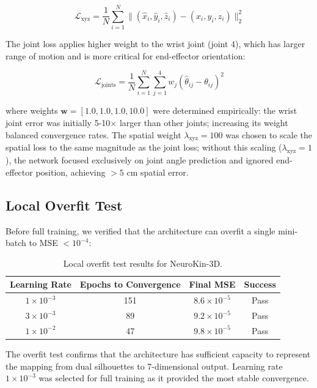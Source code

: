 \documentclass[12pt,a4paper,oneside]{report}
\begin{document}
\begin{equation}
\mathcal{L}_{\text{xyz}} = \frac{1}{N} \sum_{i=1}^{N} \|(\hat{x}_i, \hat{y}_i, \hat{z}_i) - (x_i, y_i, z_i)\|_2^2
\end{equation}

The joint loss applies higher weight to the wrist joint (joint 4), which has larger range of motion and is more critical for end-effector orientation:

\begin{equation}
\mathcal{L}_{\text{joints}} = \frac{1}{N} \sum_{i=1}^{N} \sum_{j=1}^{4} w_j (\hat{\theta}_{ij} - \theta_{ij})^2
\end{equation}

where weights $\mathbf{w} = [1.0, 1.0, 1.0, 10.0]$ were determined empirically: the wrist joint error was initially 5-10$\times$ larger than other joints; increasing its weight balanced convergence rates. The spatial weight $\lambda_{\text{xyz}} = 100$ was chosen to scale the spatial loss to the same magnitude as the joint loss; without this scaling ($\lambda_{\text{xyz}} = 1$), the network focused exclusively on joint angle prediction and ignored end-effector position, achieving $>5$ cm spatial error.

\subsection{Local Overfit Test}
\label{subsec:local_overfit_test}

Before full training, we verified that the architecture can overfit a single mini-batch to MSE $< 10^{-4}$:

\begin{table}[H]
\centering
\caption{Local overfit test results for NeuroKin-3D.}
\label{tab:overfit_test}
\begin{tabular}{cccc}
\toprule
Learning Rate & Epochs to Convergence & Final MSE & Success \\
\midrule
$1 \times 10^{-3}$ & 151 & $8.6 \times 10^{-5}$ & Pass \\
$3 \times 10^{-3}$ & 89 & $9.2 \times 10^{-5}$ & Pass \\
$1 \times 10^{-2}$ & 47 & $9.8 \times 10^{-5}$ & Pass \\
\bottomrule
\end{tabular}
\end{table}

The overfit test confirms that the architecture has sufficient capacity to represent the mapping from dual silhouettes to 7-dimensional output. Learning rate $1 \times 10^{-3}$ was selected for full training as it provided the most stable convergence.
\end{document}
